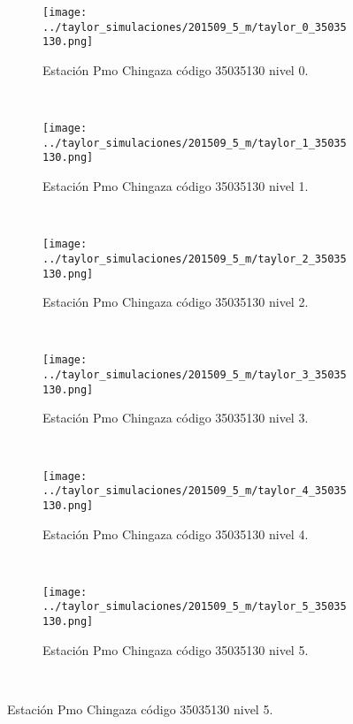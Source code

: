 \begin{figure}[H]
\centering
\begin{subfigure}[normla]{0.4\textwidth}
\caption{Estación Pmo Chingaza  código 35035130 nivel 0.}
\texttt{[image: ../taylor\_simulaciones/201509\_5\_m/taylor\_0\_35035130.png]}
\end{subfigure}
~
\begin{subfigure}[normla]{0.4\textwidth}
\caption{Estación Pmo Chingaza  código 35035130 nivel 1.}
\texttt{[image: ../taylor\_simulaciones/201509\_5\_m/taylor\_1\_35035130.png]}
\end{subfigure}
~
\begin{subfigure}[normla]{0.4\textwidth}
\caption{Estación Pmo Chingaza  código 35035130 nivel 2.}
\texttt{[image: ../taylor\_simulaciones/201509\_5\_m/taylor\_2\_35035130.png]}
\end{subfigure}
~
\begin{subfigure}[normla]{0.4\textwidth}
\caption{Estación Pmo Chingaza  código 35035130 nivel 3.}
\texttt{[image: ../taylor\_simulaciones/201509\_5\_m/taylor\_3\_35035130.png]}
\end{subfigure}
~
\begin{subfigure}[normla]{0.4\textwidth}
\caption{Estación Pmo Chingaza  código 35035130 nivel 4.}
\texttt{[image: ../taylor\_simulaciones/201509\_5\_m/taylor\_4\_35035130.png]}
\end{subfigure}
~
\begin{subfigure}[normla]{0.4\textwidth}
\caption{Estación Pmo Chingaza  código 35035130 nivel 5.}
\texttt{[image: ../taylor\_simulaciones/201509\_5\_m/taylor\_5\_35035130.png]}
\end{subfigure}
~
\end{figure}
           
